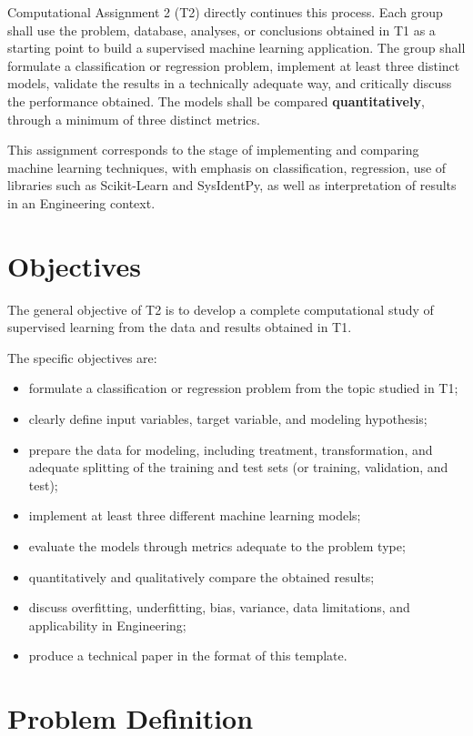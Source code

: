 \documentclass[a4paper]{ifacconf}
\begin{document}
Computational Assignment 2 (T2) directly continues this process. Each group shall use the problem, database, analyses, or conclusions obtained in T1 as a starting point to build a supervised machine learning application. The group shall formulate a classification or regression problem, implement at least three distinct models, validate the results in a technically adequate way, and critically discuss the performance obtained. The models shall be compared \textbf{quantitatively}, through a minimum of three distinct metrics.

This assignment corresponds to the stage of implementing and comparing machine learning techniques, with emphasis on classification, regression, use of libraries such as Scikit-Learn and SysIdentPy, as well as interpretation of results in an Engineering context.

\section{Objectives}

The general objective of T2 is to develop a complete computational study of supervised learning from the data and results obtained in T1.

The specific objectives are:
\begin{itemize}
    \item formulate a classification or regression problem from the topic studied in T1;
    \item clearly define input variables, target variable, and modeling hypothesis;
    \item prepare the data for modeling, including treatment, transformation, and adequate splitting of the training and test sets (or training, validation, and test);
    \item implement at least three different machine learning models;
    \item evaluate the models through metrics adequate to the problem type;
    \item quantitatively and qualitatively compare the obtained results;
    \item discuss overfitting, underfitting, bias, variance, data limitations, and applicability in Engineering;
    \item produce a technical paper in the format of this template.
\end{itemize}


\section{Problem Definition}
\end{document}
